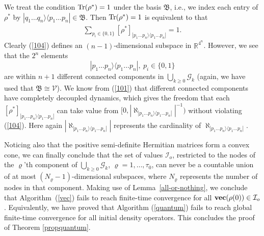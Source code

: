 \documentclass[a4paper, 11pt]{article}
\begin{document}
We treat the condition ${\rm Tr}(\rho^\ast)=1$ under the basis  $\mathfrak{B}$, i.e., we index each entry of $\rho^\ast$ by $|q_1 \dots q_n \rangle \langle p_1 \dots p_n|\in \mathfrak{B}$. Then ${\rm Tr}(\rho^\ast)=1$ is equivalent to that
\begin{align}\label{104}
\sum_{p_i \in \{0,1\}} [\rho^\ast]_{|p_1 \dots p_n \rangle \langle p_1 \dots p_n|} =1.
\end{align}
Clearly (\ref{104}) defines an $(n-1)$-dimensional subspace in $\mathbb{R}^{4^n}$. However, we see that the $2^n$ elements
$$
|p_1 \dots p_n \rangle \langle p_1 \dots p_n|,\ p_i \in \{0,1\}
$$
are within $n+1$ different connected components in  $\bigcup_{k\geq 0}\mathcal{G}_k$ (again, we have used that $\mathfrak{B}\cong \mathcal{V}$). We know from (\ref{101}) that different connected components have completely decoupled dynamics, which gives the freedom that  each $[\rho^\ast]_{|p_1 \dots p_n \rangle \langle p_1 \dots p_n|}$ can take value from $[0, |\aleph_{|p_1 \dots p_n \rangle \langle p_1 \dots p_n|}|^{-1})$ without violating (\ref{104}). Here again $|\aleph_{|p_1 \dots p_n \rangle \langle p_1 \dots p_n|}|$ represents the cardinality of $\aleph_{|p_1 \dots p_n \rangle \langle p_1 \dots p_n|}$.


Noticing also that the positive semi-definite Hermitian matrices form a convex cone, we can finally conclude that the set of values $\mathcal{I}_o$, restricted to the nodes of the $\varrho$'th component of $\bigcup_{k\geq 0}\mathcal{G}_k$, $\varrho=1,\dots,\tau_0$, can never be a countable union of at most $(N_\varrho-1)$-dimensional subspaces, where $N_\varrho$ represents the number of nodes in that component. Making use of  Lemma~\ref{all-or-nothing}, we conclude that Algorithm~(\ref{vec}) fails to reach finite-time convergence for all ${ \rm \bf vec} (\rho(0)) \in \mathcal{I}_o$. Equivalently, we have proved that  Algorithm (\ref{quantum}) fails to reach global finite-time convergence for all initial density operators. This concludes the proof of Theorem \ref{propquantum}.
\end{document}
